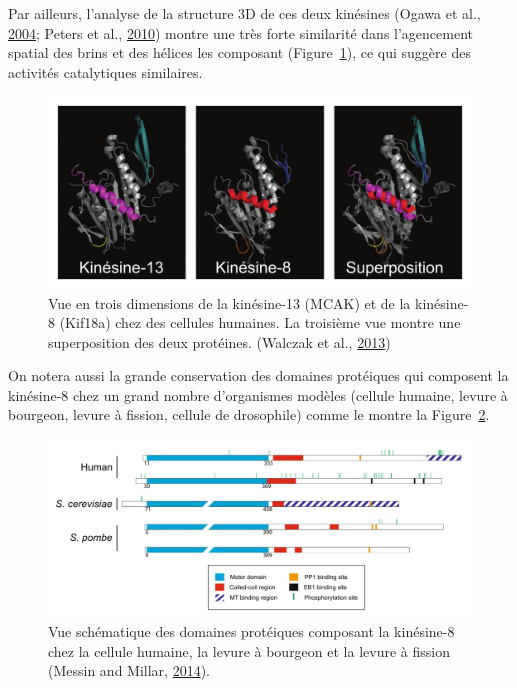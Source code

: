 \documentclass[12pt,a4paper,twoside,openright]{book}
\begin{document}
Par ailleurs, l'analyse de la structure 3D de ces deux kinésines (Ogawa
et al., \protect\hyperlink{ref-Ogawa2004}{2004}; Peters et al.,
\protect\hyperlink{ref-Peters2010}{2010}) montre une très forte
similarité dans l'agencement spatial des brins et des hélices les
composant (Figure~\ref{fig:dep_kinesin}), ce qui suggère des activités
catalytiques similaires.

\begin{figure}[htbp]
\centering
\includegraphics{figures/intro/dep_kinesin.png}
\caption{\label{fig:dep_kinesin}Vue en trois dimensions de la
kinésine-13 (MCAK) et de la kinésine-8 (Kif18a) chez des cellules
humaines. La troisième vue montre une superposition des deux protéines.
(Walczak et al., \protect\hyperlink{ref-Walczak2013a}{2013})}
\end{figure}

On notera aussi la grande conservation des domaines protéiques qui
composent la kinésine-8 chez un grand nombre d'organismes modèles
(cellule humaine, levure à bourgeon, levure à fission, cellule de
drosophile) comme le montre la Figure~\ref{fig:proteicdomain}.

\begin{figure}[htbp]
\centering
\includegraphics{figures/intro/proteicdomain.png}
\caption{\label{fig:proteicdomain}Vue schématique des domaines
protéiques composant la kinésine-8 chez la cellule humaine, la levure à
bourgeon et la levure à fission (Messin and Millar,
\protect\hyperlink{ref-Messin2014}{2014}).}
\end{figure}
\end{document}
